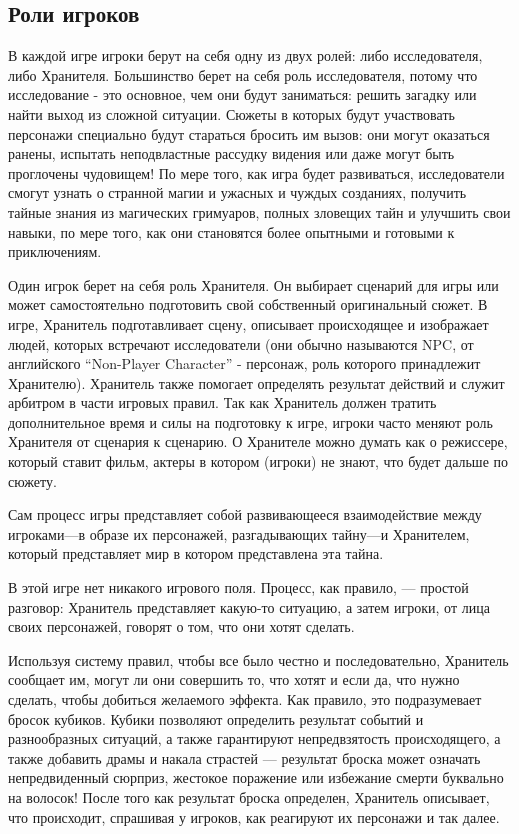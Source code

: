 \documentclass[letterpaper,twocolumn,openany, twoside, 11pt, usenames]{cocbook}
\begin{document}
\subsection*{\nohyphens{Роли игроков}}

В каждой игре игроки берут на себя одну из двух ролей: либо исследователя, либо Хранителя. Большинство берет на себя роль исследователя, потому что исследование - это основное, чем они будут заниматься: решить загадку или найти выход из сложной ситуации. Сюжеты в которых будут участвовать персонажи специально будут стараться бросить им вызов: они могут оказаться ранены, испытать неподвластные рассудку видения или даже могут быть проглочены чудовищем! По мере того, как игра будет развиваться, исследователи смогут узнать о странной магии и ужасных и чуждых созданиях, получить тайные знания из магических гримуаров, полных зловещих тайн и улучшить свои навыки, по мере того, как они становятся более опытными и готовыми к приключениям.

Один игрок берет на себя роль Хранителя. Он выбирает сценарий для игры или может самостоятельно подготовить свой собственный оригинальный сюжет. В игре, Хранитель подготавливает сцену, описывает происходящее и изображает людей, которых встречают исследователи (они обычно называются NPC, от английского ``Non-Player Character'' - персонаж, роль которого принадлежит Хранителю). Хранитель также помогает определять результат действий и служит арбитром в части игровых правил. Так как Хранитель должен тратить дополнительное время и силы на подготовку к игре, игроки часто меняют роль Хранителя от сценария к сценарию. О Хранителе можно думать как о режиссере, который ставит фильм, актеры в котором (игроки) не знают, что будет дальше по сюжету.

Сам процесс игры представляет собой развивающееся взаимодействие между игроками---в образе их персонажей, разгадывающих тайну---и Хранителем, который представляет мир в котором представлена эта тайна.

В этой игре нет никакого игрового поля. Процесс, как правило, --- простой разговор: Хранитель представляет какую-то ситуацию, а затем игроки, от лица своих персонажей, говорят о том, что они хотят сделать.

Используя систему правил, чтобы все было честно и последовательно, Хранитель сообщает им, могут ли они совершить то, что хотят и если да, что нужно сделать, чтобы добиться желаемого эффекта. Как правило, это подразумевает бросок кубиков. Кубики позволяют определить результат событий и разнообразных ситуаций, а также гарантируют непредвзятость происходящего, а также добавить драмы и накала страстей --- результат броска может означать непредвиденный сюрприз, жестокое поражение или избежание смерти буквально на волосок! После того как результат броска определен, Хранитель описывает, что происходит, спрашивая у игроков, как реагируют их персонажи и так далее.
\end{document}
